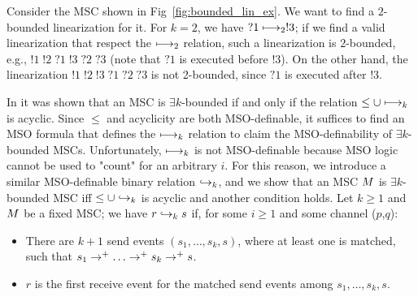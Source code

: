 \begin{example}
  Consider the MSC shown in Fig~\ref{fig:bounded_lin_ex}. We want to find a $2$-bounded linearization for it. For $k=2$, we have $?1 \longmapsto_{2} !3$; if we find a valid linearization that respect the $\longmapsto_{2}$ relation, such a linearization is $2$-bounded, e.g., $!1\;!2\;?1\;!3\;?2\;?3$ (note that $?1$ is executed before $!3$). On the other hand, the linearization $!1\;!2\;!3\;?1\;?2\;?3$ is not 2-bounded, since $?1$ is executed after $!3$.
\end{example}  


In \cite{DBLP:conf/fossacs/LohreyM02} it was shown that an MSC is $\exists k$-bounded if and only if the relation $\le \cup \longmapsto_k$ is acyclic. Since $\le$ and acyclicity are both MSO-definable, it suffices to find an MSO formula that defines the $\longmapsto_k$ relation to claim the MSO-definability of $\exists k$-bounded MSCs. Unfortunately, $\longmapsto_k$ is not MSO-definable because MSO logic cannot be used to "count" for an arbitrary $i$. For this reason, we introduce a similar MSO-definable binary relation $\hookrightarrow_{k}$, and we show that an MSC $M$ is $\exists k$-bounded MSC iff $\le \cup \hookrightarrow_{k}$ is acyclic and another condition holds. Let $k \ge 1$ and $M$ be a fixed MSC; we have $r \hookrightarrow_{k} s$ if, for some $i \ge 1$ and some channel ($p$,$q$):
\begin{itemize}\itemsep=0.5ex
	\item There are $k+1$ send events $(s_1, \dots, s_k, s)$, where at least one is matched, such that $s_1 \procrel^+ \dots \procrel^+ s_k \procrel^+ s$.
 	\item $r$ is the first receive event for the matched send events among $s_1, \dots, s_k, s$.
\end{itemize}

